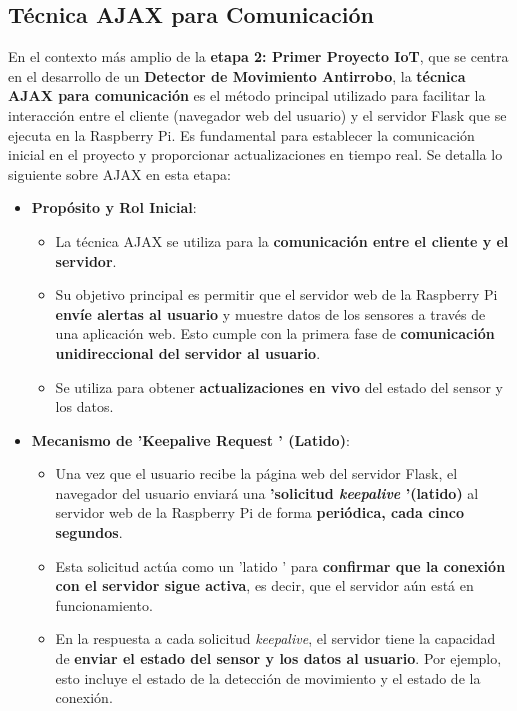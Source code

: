 \documentclass{report}
\begin{document}
\subsection{Técnica AJAX para Comunicación}
En el contexto más amplio de la \textbf{etapa 2: Primer Proyecto IoT}, que se centra en el desarrollo de un \textbf{Detector de Movimiento Antirrobo}, 
la \textbf{técnica AJAX para comunicación} es el método principal utilizado para facilitar la interacción entre el cliente (navegador web del usuario) 
y el servidor Flask que se ejecuta en la Raspberry Pi. Es fundamental para establecer la comunicación inicial en el proyecto y proporcionar 
actualizaciones en tiempo real. Se detalla lo siguiente sobre AJAX en esta etapa:

\begin{itemize}
    \item \textbf{Propósito y Rol Inicial}:
    \begin{itemize}
        \item La técnica AJAX se utiliza para la \textbf{comunicación entre el cliente y el servidor}.
        \item Su objetivo principal es permitir que el servidor web de la Raspberry Pi \textbf{envíe alertas al usuario} y muestre datos de los sensores 
        a través de una aplicación web. Esto cumple con la primera fase de \textbf{comunicación unidireccional del servidor al usuario}.
        \item Se utiliza para obtener \textbf{actualizaciones en vivo} del estado del sensor y los datos.
    \end{itemize}

    \item \textbf{Mecanismo de  'Keepalive Request ' (Latido)}:
    \begin{itemize}
        \item Una vez que el usuario recibe la página web del servidor Flask, el navegador del usuario enviará una \textbf{ 'solicitud \textit{keepalive} 
        '(latido)} al servidor web de la Raspberry Pi de forma \textbf{periódica, cada cinco segundos}.
        \item Esta solicitud actúa como un  'latido ' para \textbf{confirmar que la conexión con el servidor sigue activa}, es decir, que el servidor 
        aún está en funcionamiento.
        \item En la respuesta a cada solicitud \textit{keepalive}, el servidor tiene la capacidad de \textbf{enviar el estado del sensor y los datos 
        al usuario}. Por ejemplo, esto incluye el estado de la detección de movimiento y el estado de la conexión.
    \end{itemize}


\end{itemize}
\end{document}
